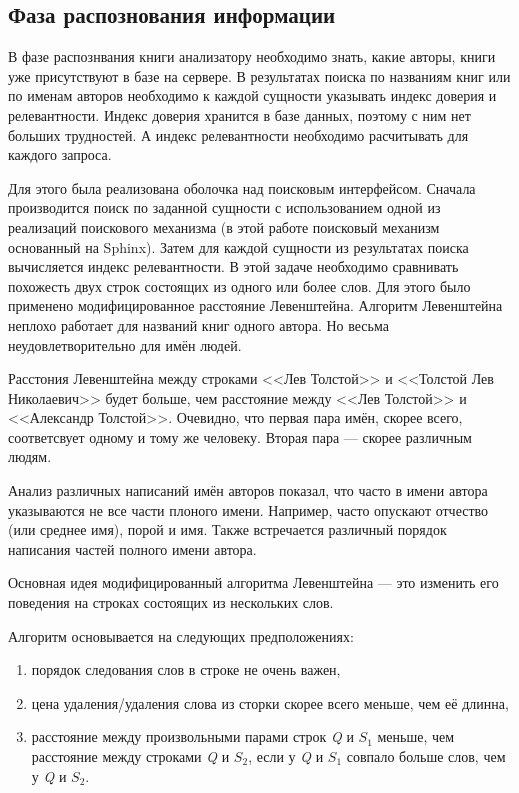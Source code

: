 \subsection{Фаза распознования информации}

В фазе распознвания книги анализатору необходимо знать, какие авторы, книги уже присутствуют в базе на сервере.
В результатах поиска по названиям книг или по именам авторов необходимо к каждой сущности указывать индекс доверия и релевантности.
Индекс доверия хранится в базе данных, поэтому с ним нет больших трудностей.
А индекс релевантности необходимо расчитывать для каждого запроса.

Для этого была реализована оболочка над поисковым интерфейсом.
Сначала производится поиск по заданной сущности с использованием одной из реализаций поискового механизма (в этой работе поисковый механизм основанный на Sphinx). Затем для каждой сущности из результатах поиска вычисляется индекс релевантности.
В этой задаче необходимо сравнивать похожесть двух строк состоящих из одного или более слов.
Для этого было применено модифицированное расстояние Левенштейна.
Алгоритм Левенштейна \cite{distance} неплохо работает для названий книг одного автора.
Но весьма неудовлетворительно для имён людей.

Расстония Левенштейна между строками <<Лев Толстой>> и <<Толстой Лев Николаевич>> будет больше, 
чем расстояние между <<Лев Толстой>> и <<Александр Толстой>>.
Очевидно, что первая пара имён, скорее всего, соответсвует одному и тому же человеку. Вторая пара --- скорее различным людям.

Анализ различных написаний имён авторов показал, что часто в имени автора указываются не все части плоного имени.
Например, часто опускают отчество (или среднее имя), порой и имя.
Также встречается различный порядок написания частей полного имени автора.

Основная идея модифицированный алгоритма Левенштейна --- это изменить его поведения на строках состоящих из нескольких слов.

Алгоритм основывается на следующих предположениях:
\begin{enumerate}
	\item порядок следования слов в строке не очень важен,
	\item цена удаления/удаления слова из сторки скорее всего меньше, чем её длинна,
	\item расстояние между произвольными парами строк \textit{Q} и \textit{$S_{1}$} меньше, 
	  	  чем расстояние между строками \textit{Q} и \textit{$S_{2}$},
		  если у \textit{Q} и \textit{$S_{1}$} совпало больше слов, чем у \textit{Q} и \textit{$S_{2}$}.
\end{enumerate}


